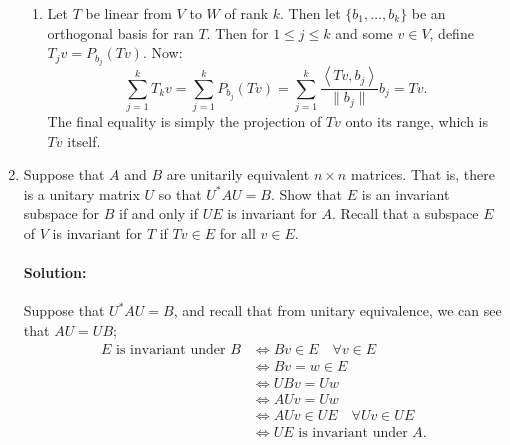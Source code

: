 \documentclass{article}
\begin{document}
\begin{enumerate}
\begin{enumerate}[label= (\alph*)]
    \item Let $T$ be linear from $V$ to $W$ of rank $k$. Then let $\{b_1,\dots,b_k\} $ be an orthogonal basis for $\text{ran }T$. Then for $1\leq j\leq k$ and some $v\in V$, define $T_jv=P_{b_j}(Tv)$. Now:
        \[
            \sum_{j=1}^{k} T_k v=\sum_{j=1}^{k} P_{b_j}(Tv)=\sum_{j=1}^{k} \frac{\left<Tv,b_j \right>}{\|b_j\|}b_j=Tv
        .\] 
        The final equality is simply the projection of $Tv$ onto its range, which is $Tv$ itself.
\end{enumerate}
\newpage

\item Suppose that $A$ and $B$ are unitarily equivalent $n \times n$ matrices. That is, there is a unitary matrix $U$ so that $U^*AU = B$. Show that $E$ is an invariant subspace for $B$ if and only if $UE$ is invariant for $A$.
Recall that a subspace $E$ of $V$ is invariant for $T$ if $Tv \in E$ for all $v \in E$.
\paragraph{Solution: }Suppose that $ U^* AU=B$, and recall that from unitary equivalence, we can see that $AU=UB$;
\begin{align*}
    E \text{ is invariant under }B&\iff Bv\in E\quad\forall v\in E\\
                        &\iff Bv=w\in E\\
                         &\iff UBv=Uw\\
                         &\iff AUv=Uw\\
                         &\iff AUv\in UE\quad \forall Uv\in UE\\
                         &\iff  UE \text{ is invariant under } A
.\end{align*}
\end{enumerate}
\end{document}
